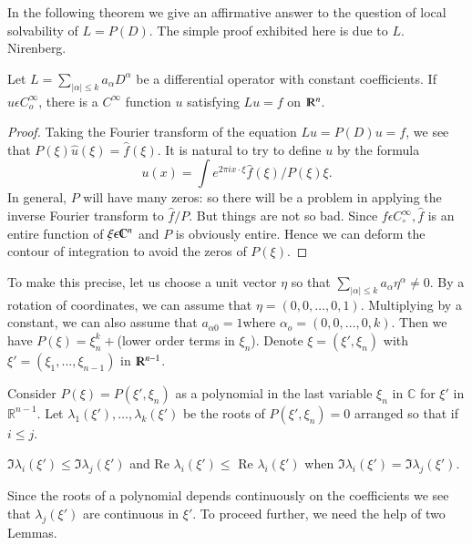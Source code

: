 In the following theorem we give an affirmative answer to the question
of local solvability of $L =P(D)$. The simple proof exhibited here is
due to $L$. Nirenberg. 

\setcounter{thm}{1}
\begin{thm}\label{chap2:sec1:thm2.2}%
  Let $L = \sum \limits_{|\alpha| \leq k} a_{\alpha} D^{\alpha}$
  be a differential operator with constant coefficients. If $u
  \epsilon C^{\infty}_o$, there is a $C^{\infty}$ function $u$
  satisfying $Lu =f $ on $\varmathbb{R}^n$. 
\end{thm}

\begin{proof}
  Taking the Fourier transform of the equation $Lu =P(D) u =f$, we see
  that $P(\xi) \hat{u}(\xi) = \hat{f}(\xi)$. It is natural to try to
  define $u$ by the formula 
  $$
  u(x) = \int e^{2 \pi i x\cdot \xi } \hat{f}(\xi)/P(\xi) \xi.
  $$
  In general, $P$ will have many zeros: so there will be a problem in
  applying the inverse Fourier transform to $\hat{f}/P$. But things are
  not so bad. Since $ f \epsilon C^{\infty}_\circ, \hat{f}$ is an
  entire function of $\xi \epsilon \varmathbb{C}^n$ and $P$ is
  obviously entire. Hence we can deform the contour of integration to
  avoid the zeros of $P(\xi)$. 
\end{proof}

To make this precise, let us choose a unit vector $\eta$ so that $\sum
\limits_{|\alpha| \leq k} a_{\alpha}\eta^{\alpha} \neq 0$. By a
rotation of coordinates, we can assume that $\eta = (0,0, \ldots
,0,1)$. Multiplying by a constant, we can also assume that
$a_{\alpha 0}=1$\pageoriginale where $\alpha_o =(0,0, \ldots,0,k)$. Then we have
$P(\xi)= \xi^k_n+$(lower order terms in $ \xi_n$). Denote $\xi =
(\xi', \xi_n)$ with $\xi'= (\xi_1, \ldots, \xi_{n-1})$ in
$\varmathbb{R}^{n-1}$. 

Consider $P(\xi)= P(\xi', \xi_n)$ as a polynomial in the last variable
$\xi_n$ in $\mathbb{C}$ for $\xi'$ in $\mathbb{R}^{n-1}$. Let
$\lambda_1 (\xi'), \ldots, \lambda_k(\xi')$ be the roots of $P(\xi',
\xi_n) = 0$ arranged so that if $i \leq j$. 

$\Im \lambda_i (\xi') \leq  \Im \lambda_j (\xi')$ and Re $\lambda_i
(\xi') \leq$ Re $\lambda_i (\xi')$ when $\Im \lambda_i (\xi') =
\Im \lambda_j (\xi')$. 

Since the roots of a polynomial depends continuously on the
coefficients we see that $\lambda_j (\xi') $ are continuous in
$\xi'$. To proceed further, we need the help of two Lemmas. 

